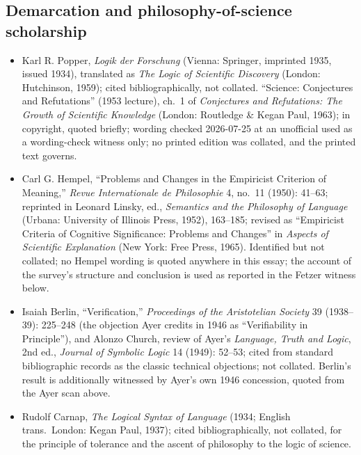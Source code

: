 \subsection*{Demarcation and philosophy-of-science scholarship}

{\fontsize{8.6}{9.6}\selectfont
\begin{itemize}[itemsep=0pt,parsep=0pt,topsep=0.05em]
\item Karl R. Popper, \emph{Logik der Forschung} (Vienna: Springer, imprinted 1935, issued 1934), translated as \emph{The Logic of Scientific Discovery} (London: Hutchinson, 1959); cited bibliographically, not collated. ``Science: Conjectures and Refutations'' (1953 lecture), ch.~1 of \emph{Conjectures and Refutations: The Growth of Scientific Knowledge} (London: Routledge \& Kegan Paul, 1963); in copyright, quoted briefly; wording checked 2026-07-25 at an unofficial  used as a wording-check witness only; no printed edition was collated, and the printed text governs.
\item Carl G. Hempel, ``Problems and Changes in the Empiricist Criterion of Meaning,'' \emph{Revue Internationale de Philosophie} 4, no.~11 (1950): 41--63; reprinted in Leonard Linsky, ed., \emph{Semantics and the Philosophy of Language} (Urbana: University of Illinois Press, 1952), 163--185; revised as ``Empiricist Criteria of Cognitive Significance: Problems and Changes'' in \emph{Aspects of Scientific Explanation} (New York: Free Press, 1965). Identified but not collated; no Hempel wording is quoted anywhere in this essay; the account of the survey's structure and conclusion is used as reported in the Fetzer witness below.
\item Isaiah Berlin, ``Verification,'' \emph{Proceedings of the Aristotelian Society} 39 (1938--39): 225--248 (the objection Ayer credits in 1946 as ``Verifiability in Principle''), and Alonzo Church, review of Ayer's \emph{Language, Truth and Logic}, 2nd ed., \emph{Journal of Symbolic Logic} 14 (1949): 52--53; cited from standard bibliographic records as the classic technical objections; not collated. Berlin's result is additionally witnessed by Ayer's own 1946 concession, quoted from the Ayer scan above.
\item Rudolf Carnap, \emph{The Logical Syntax of Language} (1934; English trans.\ London: Kegan Paul, 1937); cited bibliographically, not collated, for the principle of tolerance and the ascent of philosophy to the logic of science.

\end{itemize}}
